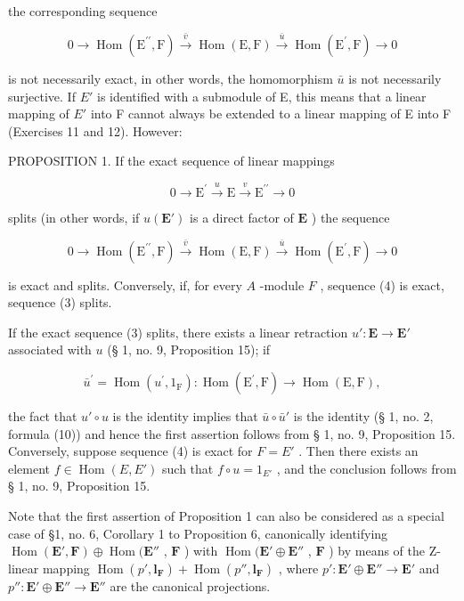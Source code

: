 the corresponding sequence

\[
0 \longrightarrow \operatorname{Hom} (\mathrm{E} ^ {\prime \prime}, \mathrm{F}) \stackrel {\bar {v}} {\longrightarrow} \operatorname{Hom} (\mathrm{E}, \mathrm{F}) \stackrel {\bar {u}} {\longrightarrow} \operatorname{Hom} (\mathrm{E} ^ {\prime}, \mathrm{F}) \longrightarrow 0
\]

is not necessarily exact, in other words, the homomorphism \(\bar{u}\) is not necessarily surjective. If \(E'\) is identified with a submodule of E, this means that a linear mapping of \(E'\) into F cannot always be extended to a linear mapping of E into F (Exercises 11 and 12). However:

PROPOSITION 1. If the exact sequence of linear mappings

\[
0 \longrightarrow \mathrm{E} ^ {\prime} \stackrel {u} {\longrightarrow} \mathrm{E} \stackrel {v} {\longrightarrow} \mathrm{E} ^ {\prime \prime} \longrightarrow 0\tag{3}
\]

splits (in other words, if \(u(\mathbf{E}')\) is a direct factor of \(\mathbf{E}\) ) the sequence

\[
0 \longrightarrow \operatorname{Hom} (\mathrm{E} ^ {\prime \prime}, \mathrm{F}) \stackrel {\bar {v}} {\longrightarrow} \operatorname{Hom} (\mathrm{E}, \mathrm{F}) \stackrel {\bar {u}} {\longrightarrow} \operatorname{Hom} (\mathrm{E} ^ {\prime}, \mathrm{F}) \longrightarrow 0
\]

is exact and splits. Conversely, if, for every \(A\) -module \(F\) , sequence (4) is exact, sequence (3) splits.

If the exact sequence (3) splits, there exists a linear retraction \(u': \mathbf{E} \to \mathbf{E}'\) associated with \(u\) (§ 1, no. 9, Proposition 15); if

\[
\bar {u} ^ {\prime} = \operatorname{Hom} (u ^ {\prime}, 1 _ {\mathrm{F}}): \operatorname{Hom} (\mathrm{E} ^ {\prime}, \mathrm{F}) \rightarrow \operatorname{Hom} (\mathrm{E}, \mathrm{F}),
\]

the fact that \(u' \circ u\) is the identity implies that \(\bar{u} \circ \bar{u}'\) is the identity (§ 1, no. 2, formula (10)) and hence the first assertion follows from § 1, no. 9, Proposition 15. Conversely, suppose sequence (4) is exact for \(F = E'\) . Then there exists an element \(f \in \operatorname{Hom}(E, E')\) such that \(f \circ u = 1_{E'}\) , and the conclusion follows from § 1, no. 9, Proposition 15.

Note that the first assertion of Proposition 1 can also be considered as a special case of §1, no. 6, Corollary 1 to Proposition 6, canonically identifying \(\operatorname{Hom}(\mathbf{E}',\mathbf{F}) \oplus \operatorname{Hom}(\mathbf{E}''\) , \(\mathbf{F}\) ) with \(\operatorname{Hom}(\mathbf{E}' \oplus \mathbf{E}''\) , \(\mathbf{F}\) ) by means of the Z-linear mapping \(\operatorname{Hom}(p',\mathbf{l}_{\mathbf{F}}) + \operatorname{Hom}(p'',\mathbf{l}_{\mathbf{F}})\) , where \(p':\mathbf{E}' \oplus \mathbf{E}'' \to \mathbf{E}'\) and \(p'':\mathbf{E}' \oplus \mathbf{E}'' \to \mathbf{E}''\) are the canonical projections.

